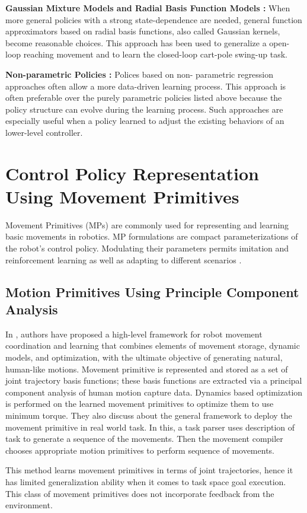 \textbf{Gaussian Mixture Models and Radial Basis Function Models :} When more general policies with a strong state-dependence are needed, general function approximators based on radial basis functions, also called Gaussian kernels, become reasonable choices.
This approach has been used to generalize a open-loop reaching movement and to learn the closed-loop cart-pole swing-up task.

\textbf{Non-parametric Policies :} Polices based on non- parametric regression approaches often allow a more data-driven learning process. This approach is often preferable over the purely parametric policies listed above because the policy structure can evolve during the learning process. Such approaches are especially useful when a policy learned to adjust the existing behaviors of an lower-level controller. 


\section{Control Policy Representation Using Movement Primitives}
Movement Primitives (MPs) are commonly used for representing and learning basic movements in robotics. MP formulations are compact parameterizations of the robot’s control policy. Modulating their parameters permits imitation and reinforcement learning as well as adapting to different scenarios \cite{paraschos2013probabilistic}. 

\subsection{Motion Primitives Using Principle Component Analysis}
In \cite{lim2005movement}, authors have proposed a high-level framework for robot movement coordination and learning that combines elements of movement storage, dynamic models, and optimization, with the ultimate objective of generating natural, human-like motions. Movement primitive is represented and stored as a set of joint trajectory basis functions; these basis functions are extracted via a principal component analysis of human motion capture data. Dynamics based optimization is performed on the learned movement primitives to optimize them to use minimum torque. They also discuss about the general framework to deploy the movement primitive in real world task. In this, a task parser uses description of task to generate a sequence of the movements. Then the movement compiler chooses appropriate motion primitives to perform sequence of movements. 
\par This method learns movement primitives in terms of joint trajectories, hence it has limited generalization ability when it comes to task space goal execution. This class of movement primitives does not incorporate feedback from the environment.   

